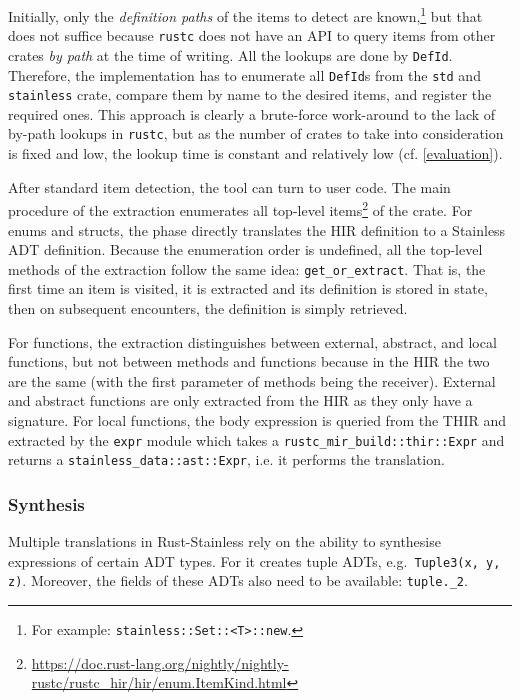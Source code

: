 Initially, only the \emph{definition paths} of the items to detect are
known,\footnote{For example: \lstinline!stainless::Set::<T>::new!.} but that
does not suffice because \lstinline!rustc! does not have an API to query items
from other crates \emph{by path} at the time of writing. All the lookups are
done by \lstinline!DefId!. Therefore, the implementation has to enumerate all
\lstinline!DefId!s from the \lstinline!std! and \lstinline!stainless! crate,
compare them by name to the desired items, and register the required ones. This
approach is clearly a brute-force work-around to the lack of by-path lookups in
\lstinline!rustc!, but as the number of crates to take into consideration is
fixed and low, the lookup time is constant and relatively low (cf.
\autoref{evaluation}).

After standard item detection, the tool can turn to user code. The main
procedure of the extraction enumerates all top-level
items\footnote{\url{https://doc.rust-lang.org/nightly/nightly-rustc/rustc_hir/hir/enum.ItemKind.html}}
of the crate. For enums and structs, the phase directly translates the HIR
definition to a Stainless ADT definition. Because the enumeration order is
undefined, all the top-level methods of the extraction follow the same idea:
\lstinline!get_or_extract!. That is, the first time an item is visited, it is
extracted and its definition is stored in state, then on subsequent encounters,
the definition is simply retrieved.

For functions, the extraction distinguishes between external, abstract, and
local functions, but not between methods and functions because in the HIR the
two are the same (with the first parameter of methods being the receiver).
External and abstract functions are only extracted from the HIR as they only
have a signature. For local functions, the body expression is queried from the
THIR and extracted by the \lstinline!expr! module which takes a
\lstinline!rustc_mir_build::thir::Expr! and returns a
\lstinline!stainless_data::ast::Expr!, i.e. it performs the translation.

\subsubsection{Synthesis}

Multiple translations in Rust-Stainless rely on the ability to synthesise
expressions of certain ADT types. For it creates tuple ADTs,
e.g.~\passthrough{\lstinline!Tuple3(x, y, z)!}. Moreover, the fields of these
ADTs also need to be available: \lstinline!tuple._2!.

